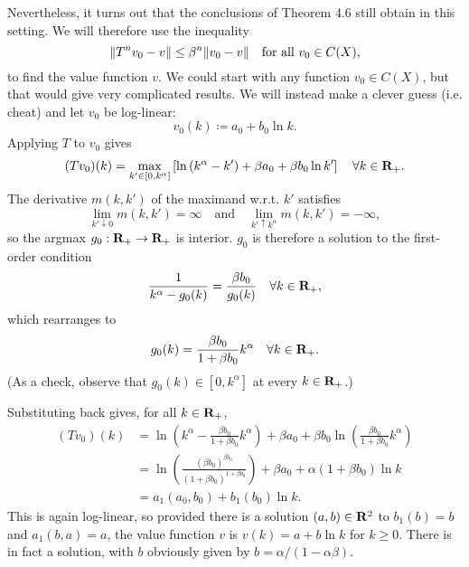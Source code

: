 \documentclass[11pt,letterpaper,reqno,oneside]{article}
\begin{document}
Nevertheless, it turns out that the conclusions of Theorem 4.6 still obtain in this setting. We will therefore use the inequality
%
\begin{equation*}
	\lVert T^n v_0 - v \rVert \leq \beta^n \lVert v_0 - v \rVert 
	\quad\text{for all $v_0 \in C(X)$} ,
\end{equation*}
%
to find the value function $v$. We could start with any function $v_0 \in C(X)$, but that would give very complicated results. We will instead make a clever guess (i.e. cheat) and let $v_0$ be log-linear:
%
\begin{equation*}
	v_0(k) \coloneqq a_0 + b_0 \ln k .
\end{equation*}
%
Applying $T$ to $v_0$ gives
%
\begin{equation*}
	(Tv_0)(k) = \max_{k' \in [0,k^\alpha]} 
	\left[ \ln \left( k^\alpha - k' \right) 
	+ \beta a_0 + \beta b_0 \ln k' \right]
	\quad\forall k \in \mathbf{R}_+ .
\end{equation*}
%
The derivative $m(k,k')$ of the maximand w.r.t. $k'$ satisfies
%
\begin{equation*}
	\lim_{k'\downarrow 0} m(k,k') = \infty
	\quad\text{and}\quad
	\lim_{k'\uparrow k^\alpha} m(k,k') = -\infty ,
\end{equation*}
%
so the argmax $g_0 : \mathbf{R}_+ \to \mathbf{R}_+$ is interior. $g_0$ is therefore a solution to the first-order condition
%
\begin{equation*}
	\frac{1}{k^\alpha - g_0(k)} = \frac{\beta b_0}{g_0(k)} 
	\quad\forall k \in \mathbf{R}_+ ,
\end{equation*}
%
which rearranges to
%
\begin{equation*}
	g_0(k) = \frac{\beta b_0}{1 + \beta b_0} k^\alpha 
	\quad\forall k \in \mathbf{R}_+ .
\end{equation*}
%
(As a check, observe that $g_0(k) \in [0,k^\alpha]$ at every $k \in \mathbf{R}_+$.)

Substituting back gives, for all $k \in \mathbf{R}_+$,
%
\begin{align*}
	(Tv_0)(k) 
	&=
	\ln \left( k^\alpha 
	- \frac{\beta b_0}{1 + \beta b_0} k^\alpha \right) 
	+ \beta a_0 + 
	\beta b_0 \ln \left( \frac{\beta b_0}{1 + \beta b_0} k^\alpha \right)
	\\
	&=
	\ln \left( \frac{ (\beta b_0)^{\beta b_0} }
	{ (1 + \beta b_0)^{1 + \beta b_0} } \right) 
	+ \beta a_0 
	+ \alpha \left( 1 + \beta b_0 \right) \ln k
	\\
	&= a_1(a_0,b_0) + b_1(b_0) \ln k .
\end{align*}
%
This is again log-linear, so provided there is a solution $(a,b) \in \mathbf{R}^2$ to $b_1(b) = b$ and $a_1(b,a) = a$, the value function $v$ is $v(k) = a + b \ln k$ for $k \geq 0$. There is in fact a solution, with $b$ obviously given by $b = \alpha/(1-\alpha\beta)$.
\end{document}
